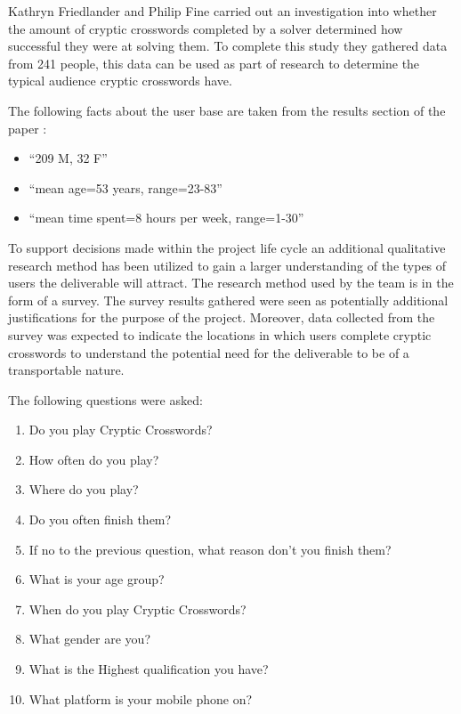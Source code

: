 Kathryn Friedlander and Philip Fine \citep{friedlander09} carried out an
investigation into whether the amount of cryptic crosswords completed by a
solver determined how successful they were at solving them. To complete this
study they gathered data from 241 people, this data can be used as part of
research to determine the typical audience cryptic crosswords have.

The following facts about the user base are taken from the results section of 
the paper \citep{friedlander09}:

\begin{itemize}
  \item ``209 M, 32 F''
  \item ``mean age=53 years, range=23-83''
  \item ``mean time spent=8 hours per week, range=1-30''
\end{itemize}

To support decisions made within the project life cycle an additional
qualitative  research method has  been utilized to gain a larger understanding
of the  types of users the deliverable will attract. The research method used by
the  team is in the form of a survey. The survey results gathered were seen as
potentially additional justifications for the purpose of the project. Moreover,
data collected from the survey was expected to indicate the locations in which
users complete cryptic crosswords to understand the potential need for the
deliverable  to be of a transportable nature.

The following questions were asked:

\begin{enumerate}
  \item Do you play Cryptic Crosswords?
  \item How often do you play?
  \item Where do you play?
  \item Do you often finish them?
  \item If no to the previous question, what reason don't you finish them?
  \item What is your age group?
  \item When do you play Cryptic Crosswords?
  \item What gender are you?
  \item What is the Highest qualification you have?
  \item What platform is your mobile phone on?
\end{enumerate}

